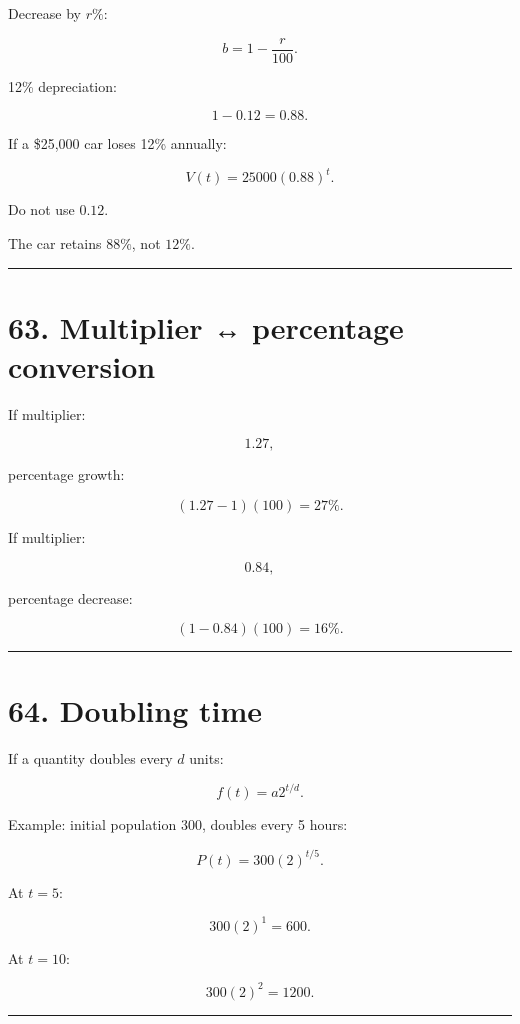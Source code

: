 \documentclass[
]{article}
\begin{document}
Decrease by \(r\%\):

\[
\boxed{b=1-\frac r{100}}.
\]

12\% depreciation:

\[
1-0.12=0.88.
\]

If a \$25,000 car loses 12\% annually:

\[
\boxed{V(t)=25000(0.88)^t}.
\]

Do not use \(0.12\).

The car retains \(88\%\), not \(12\%\).

\begin{center}\rule{0.5\linewidth}{0.5pt}\end{center}

\section{63. Multiplier ↔ percentage
conversion}\label{multiplier-percentage-conversion}

If multiplier:

\[
1.27,
\]

percentage growth:

\[
(1.27-1)(100)=27\%.
\]

If multiplier:

\[
0.84,
\]

percentage decrease:

\[
(1-0.84)(100)=16\%.
\]

\begin{center}\rule{0.5\linewidth}{0.5pt}\end{center}

\section{64. Doubling time}\label{doubling-time}

If a quantity doubles every \(d\) units:

\[
\boxed{f(t)=a2^{t/d}}.
\]

Example: initial population \(300\), doubles every 5 hours:

\[
\boxed{P(t)=300(2)^{t/5}}.
\]

At \(t=5\):

\[
300(2)^1=600.
\]

At \(t=10\):

\[
300(2)^2=1200.
\]

\begin{center}\rule{0.5\linewidth}{0.5pt}\end{center}
\end{document}
